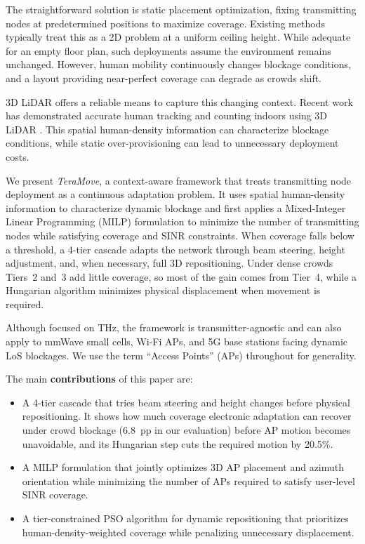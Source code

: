 \documentclass[conference]{IEEEtran}
\begin{document}
	The straightforward solution is static placement optimization, fixing transmitting nodes at predetermined positions to maximize coverage. Existing methods typically treat this as a 2D problem at a uniform ceiling height. While adequate for an empty floor plan, such deployments assume the environment remains unchanged. However, human mobility continuously changes blockage conditions, and a layout providing near-perfect coverage can degrade as crowds shift.

	3D LiDAR offers a reliable means to capture this changing context. Recent work has demonstrated accurate human tracking and counting indoors using 3D LiDAR \cite{b27,b29}. This spatial human-density information can characterize blockage conditions, while static over-provisioning can lead to unnecessary deployment costs.

	We present \textit{TeraMove}, a context-aware framework that treats transmitting node deployment as a continuous adaptation problem. It uses spatial human-density information to characterize dynamic blockage and first applies a Mixed-Integer Linear Programming (MILP) formulation to minimize the number of transmitting nodes while satisfying coverage and SINR constraints. When coverage falls below a threshold, a 4-tier cascade adapts the network through beam steering, height adjustment, and, when necessary, full 3D repositioning. Under dense crowds Tiers~2 and~3 add little coverage, so most of the gain comes from Tier~4, while a Hungarian algorithm minimizes physical displacement when movement is required.

	Although focused on THz, the framework is transmitter-agnostic and can also apply to mmWave small cells, Wi-Fi APs, and 5G base stations facing dynamic LoS blockages. We use the term ``Access Points'' (APs) throughout for generality.

	The main \textbf{contributions} of this paper are:
	\begin{itemize}
		\item A 4-tier cascade that tries beam steering and height changes before physical repositioning. It shows how much coverage electronic adaptation can recover under crowd blockage (6.8~pp in our evaluation) before AP motion becomes unavoidable, and its Hungarian step cuts the required motion by 20.5\%.

		\item A MILP formulation that jointly optimizes 3D AP placement and azimuth orientation while minimizing the number of APs required to satisfy user-level SINR coverage.

		\item A tier-constrained PSO algorithm for dynamic repositioning that prioritizes human-density-weighted coverage while penalizing unnecessary displacement.
	\end{itemize}
\end{document}
